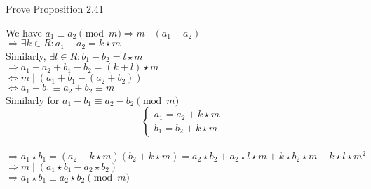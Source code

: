 \begin{exer}[2.32] Prove Proposition 2.41

    We have $a_1 \equiv a_2 \pmod m \Rightarrow m \mid (a_1 - a_2)$ \\ $\Rightarrow \exists k \in R: a_1 - a_2 = k \star m$ \\ Similarly, $\exists l \in R: b_1 - b_2 = l \star m$ \\ $\Rightarrow a_1 - a_2 + b_1 - b_2 = (k+l) \star m$ \\ $\Leftrightarrow m \mid (a_1 + b_1 - (a_2 + b_2))$ \\ $\Leftrightarrow a_1 + b_1 \equiv a_2 + b_2 \equiv m$ \\ Similarly for $a_1-b_1 \equiv a_2-b_2 \pmod m$ \begin{equation*}
        \begin{cases}
            a_1 = a_2 + k \star m \\ b_1 = b_2 + k \star m
        \end{cases}
    \end{equation*} \\ $\Rightarrow a_1 \star b_1 = (a_2 + k \star m)(b_2 + k \star m) = a_2 \star b_2 + a_2 \star l \star m + k \star b_2 \star m + k \star l \star m^2$ \\ $\Rightarrow m \mid (a_1 \star b_1 - a_2 \star b_2)$ \\ $\Rightarrow a_1 \star b_1 \equiv a_2 \star b_2 \pmod m$
\end{exer}

